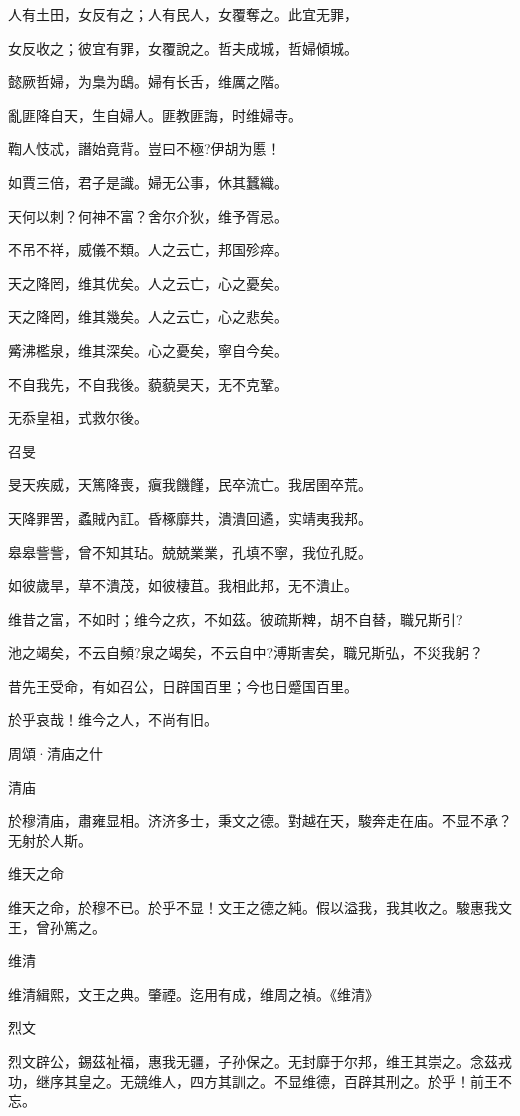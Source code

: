人有土田，女反有之；人有民人，女覆奪之。此宜无罪，

女反收之；彼宜有罪，女覆說之。哲夫成城，哲婦傾城。

懿厥哲婦，为梟为鴟。婦有长舌，维厲之階。

亂匪降自天，生自婦人。匪教匪誨，时维婦寺。

鞫人忮忒，譖始竟背。豈曰不極?伊胡为慝！

如賈三倍，君子是識。婦无公事，休其蠶織。

天何以刺？何神不富？舍尔介狄，维予胥忌。

不吊不祥，威儀不類。人之云亡，邦国殄瘁。

天之降罔，维其优矣。人之云亡，心之憂矣。

天之降罔，维其幾矣。人之云亡，心之悲矣。

觱沸檻泉，维其深矣。心之憂矣，寧自今矣。

不自我先，不自我後。藐藐昊天，无不克鞏。

无忝皇祖，式救尔後。

召旻

旻天疾威，天篤降喪，瘨我饑饉，民卒流亡。我居圉卒荒。

天降罪罟，蟊賊內訌。昏椓靡共，潰潰回遹，实靖夷我邦。

皋皋訾訾，曾不知其玷。兢兢業業，孔填不寧，我位孔貶。

如彼歲旱，草不潰茂，如彼棲苴。我相此邦，无不潰止。

维昔之富，不如时；维今之疚，不如茲。彼疏斯粺，胡不自替，職兄斯引?

池之竭矣，不云自頻?泉之竭矣，不云自中?溥斯害矣，職兄斯弘，不災我躬？

昔先王受命，有如召公，日辟国百里；今也日蹙国百里。

於乎哀哉！维今之人，不尚有旧。




周頌·清庙之什

清庙

於穆清庙，肅雍显相。济济多士，秉文之德。對越在天，駿奔走在庙。不显不承？无射於人斯。

维天之命

维天之命，於穆不已。於乎不显！文王之德之純。假以溢我，我其收之。駿惠我文王，曾孙篤之。

维清

维清緝熙，文王之典。肇禋。迄用有成，维周之禎。《维清》

烈文

烈文辟公，錫茲祉福，惠我无疆，子孙保之。无封靡于尔邦，维王其崇之。念茲戎功，继序其皇之。无競维人，四方其訓之。不显维德，百辟其刑之。於乎！前王不忘。

